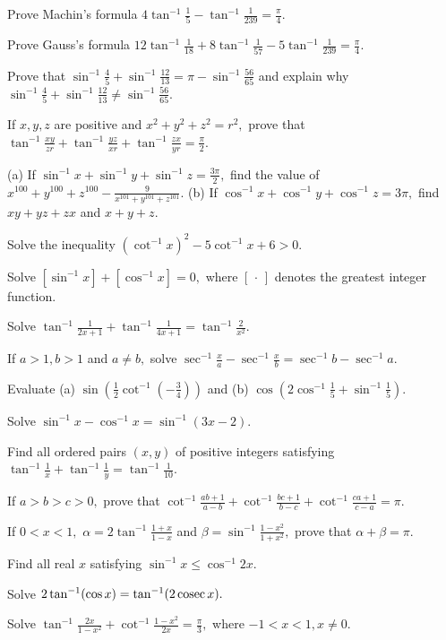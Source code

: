 \item Prove Machin's formula $4\tan^{-1}\frac{1}{5} - \tan^{-1}\frac{1}{239} = \frac{\pi}{4}.$
\item Prove Gauss's formula $12\tan^{-1}\frac{1}{18} + 8\tan^{-1}\frac{1}{57} - 5\tan^{-1}\frac{1}{239} = \frac{\pi}{4}.$
\item Prove that $\sin^{-1}\frac{4}{5} + \sin^{-1}\frac{12}{13} = \pi - \sin^{-1}\frac{56}{65}$ and explain why
  $\sin^{-1}\frac{4}{5} + \sin^{-1}\frac{12}{13}\neq \sin^{-1}\frac{56}{65}.$
\item If $x, y, z$ are positive and $x^2 + y^2 + z^2 = r^2,$ prove that $\tan^{-1}\frac{xy}{zr} + \tan^{-1}\frac{yz}{xr} +
  \tan^{-1}\frac{zx}{yr} = \frac{\pi}{2}.$
\item (a) If $\sin^{-1}x + \sin^{-1}y + \sin^{-1}z = \frac{3\pi}{2},$ find the value of $x^{100} + y^{100} + z^{100} -
  \frac{9}{x^{101} + y^{101} + z^{101}}.$ (b) If $\cos^{-1}x + \cos^{-1}y + \cos^{-1}z = 3\pi,$ find $xy + yz + zx$ and $x +
  y + z.$
\item Solve the inequality $(\cot^{-1}x)^2 - 5\cot^{-1}x + 6 > 0.$
\item Solve $[\sin^{-1}x] + [\cos^{-1}x] = 0,$ where $[\,\cdot\,]$ denotes the greatest integer function.
\item Solve $\tan^{-1}\frac{1}{2x + 1} + \tan^{-1}\frac{1}{4x + 1} = \tan^{-1}\frac{2}{x^2}.$
\item If $a > 1, b > 1$ and $a\neq b,$ solve $\sec^{-1}\frac{x}{a} - \sec^{-1}\frac{x}{b} = \sec^{-1}b - \sec^{-1}a.$
\item Evaluate (a) $\sin\left(\frac{1}{2}\cot^{-1}\left(-\frac{3}{4}\right)\right)$ and (b) $\cos\left(2\cos^{-1}\frac{1}{5} +
  \sin^{-1}\frac{1}{5}\right).$
\item Solve $\sin^{-1}x - \cos^{-1}x = \sin^{-1}(3x - 2).$
\item Find all ordered pairs $(x, y)$ of positive integers satisfying $\tan^{-1}\frac{1}{x} + \tan^{-1}\frac{1}{y} =
  \tan^{-1}\frac{1}{10}.$
\item If $a > b > c > 0,$ prove that $\cot^{-1}\frac{ab + 1}{a - b} + \cot^{-1}\frac{bc + 1}{b - c} + \cot^{-1}\frac{ca +
  1}{c - a} = \pi.$
\item If $0 < x < 1,$ $\alpha = 2\tan^{-1}\frac{1 + x}{1 - x}$ and $\beta = \sin^{-1}\frac{1 - x^2}{1 + x^2},$ prove that
  $\alpha + \beta = \pi.$
\item Find all real $x$ satisfying $\sin^{-1}x\leq \cos^{-1}2x.$
\item Solve $2\tan^{-1}(\cos x) = \tan^{-1}(2\,{\rm cosec}\,x).$
\item Solve $\tan^{-1}\frac{2x}{1 - x^2} + \cot^{-1}\frac{1 - x^2}{2x} = \frac{\pi}{3},$ where $-1 < x < 1, x\neq 0.$
\stopitemize
